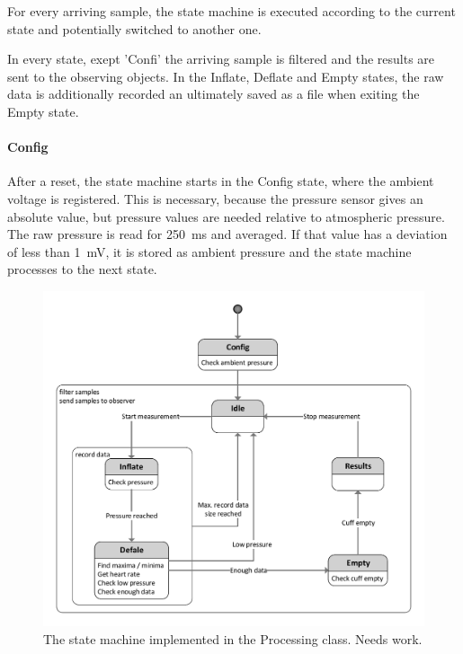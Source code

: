 For every arriving sample, the state machine is executed according to the current state and potentially switched to another one. 

In every state, exept 'Confi' the arriving sample is filtered and the results are sent to the observing objects. In the Inflate, Deflate and Empty states, the raw data is additionally recorded an ultimately saved as a file when exiting the Empty state. 

\paragraph{Config} After a reset, the state machine starts in the Config state, where the ambient voltage is registered. This is necessary, because the pressure sensor gives an absolute value, but pressure values are needed relative to atmospheric pressure. The raw pressure is read for \SI{250}{ms} and averaged. If that value has a deviation of less than \SI{1}{\milli\volt}, it is stored as ambient pressure and the state machine processes to the next state.

\begin{figure}[ht]
\centering
\includegraphics[width=\textwidth]{figures/state_machine.pdf}
\caption{The state machine implemented in the Processing class. Needs work.}
\label{fig:sm}
\end{figure}

